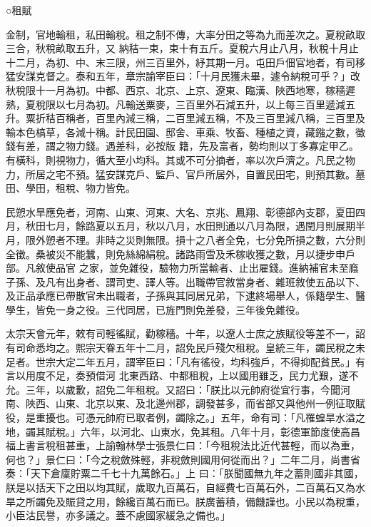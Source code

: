 \begin{pinyinscope}
 ○租賦



 金制，官地輸租，私田輸稅。租之制不傳，大率分田之等為九而差次之。夏稅畝取三合，秋稅畝取五升，又
 納秸一束，束十有五斤。夏稅六月止八月，秋稅十月止十二月，為初、中、末三限，州三百里外，紓其期一月。屯田戶佃官地者，有司移猛安謀克督之。泰和五年，章宗諭宰臣曰：「十月民獲未畢，遽令納稅可乎？」改秋稅限十一月為初。中都、西京、北京、上京、遼東、臨潢、陜西地寒，稼穡遲熟，夏稅限以七月為初。凡輸送粟麥，三百里外石減五升，以上每三百里遞減五升。粟折秸百稱者，百里內減三稱，二百里減五稱，不及三百里減八稱，三百里及輸本色槁草，各減十稱。計民田園、邸舍、車乘、牧畜、種植之資，藏鏹之數，徵錢有差，謂之物力錢。遇差科，必按版
 籍，先及富者，勢均則以丁多寡定甲乙。有橫科，則視物力，循大至小均科。其或不可分摘者，率以次戶濟之。凡民之物力，所居之宅不預。猛安謀克戶、監戶、官戶所居外，自置民田宅，則預其數。墓田、學田，租稅、物力皆免。



 民愬水旱應免者，河南、山東、河東、大名、京兆、鳳翔、彰德部內支郡，夏田四月，秋田七月，餘路夏以五月，秋以八月，水田則通以八月為限，遇閏月則展期半月，限外愬者不理。非時之災則無限。損十之八者全免，七分免所損之數，六分則全徵。桑被災不能蠶，則免絲綿絹稅。諸路雨雪及禾稼收獲之數，月以捷步申戶部。凡敘使品官
 之家，並免雜役，驗物力所當輸者、止出雇錢。進納補官未至廕子孫、及凡有出身者、謂司吏、譯人等。出職帶官敘當身者、雜班敘使五品以下、及正品承應已帶散官未出職者，子孫與其同居兄弟，下逮終場舉人，係籍學生、醫學生，皆免一身之役。三代同居，已旌門則免差發，三年後免雜役。



 太宗天會元年，敕有司輕徭賦，勸稼穡。十年，以遼人士庶之族賦役等差不一，詔有司命悉均之。熙宗天眷五年十二月，詔免民戶殘欠租稅。皇統三年，蠲民稅之未足者。世宗大定二年五月，謂宰臣曰：「凡有徭役，均科強戶，不得抑配貧民。」有言以用度不足，奏預借河
 北東西路、中都租稅，上以國用雖乏，民力尤艱，遂不允。三年，以歲歉，詔免二年租稅。又詔曰：「朕比以元帥府從宜行事，今聞河南、陜西、山東、北京以東、及北邊州郡，調發甚多，而省部又與他州一例征取賦役，是重擾也。可憑元帥府已取者例，蠲除之。」五年，命有司：「凡罹蝗旱水溢之地，蠲其賦稅。」六年，以河北、山東水，免其租。八年十月，彰德軍節度使高昌福上書言稅租甚重，上諭翰林學士張景仁曰：「今租稅法比近代甚輕，而以為重，何也？」景仁曰：「今之稅斂殊輕，非稅斂則國用何從而出？」二年二月，尚書省奏：「天下倉廩貯粟二千七十九萬餘石。」上
 曰：「朕聞國無九年之蓄則國非其國，朕是以括天下之田以均其賦，歲取九百萬石，自經費七百萬石外，二百萬石又為水旱之所蠲免及賑貸之用，餘纔百萬石而已。朕廣蓄積，備饑謹也。小民以為稅重，小臣沽民譽，亦多議之。蓋不慮國家緩急之備也。」




\end{pinyinscope}
